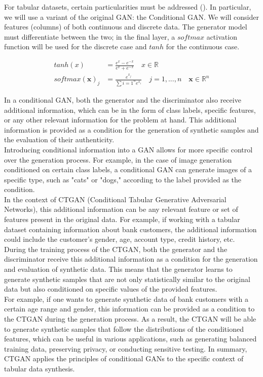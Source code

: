For tabular datasets, certain particularities must be addressed (\cite*{xu2019}). In particular, we will use a variant of the original GAN: the Conditional GAN. We will consider features (columns) of both continuous and discrete data. The generator model must differentiate between the two; in the final layer, a $softmax$ activation function will be used for the discrete case and $tanh$ for the continuous case.

\begin{align*}
tanh(x) &= \frac{e^x - e^{-x}}{e^x + e^{-x}} \quad x \in \mathbb{R} \\
softmax (\mathbf{x})_j &= \frac{e^{x_j}}{\sum{i=1}^n e^{x_i}} \quad j=1,...,n \quad \mathbf{x} \in \mathbb{R}^n
\end{align*}

In a conditional GAN, both the generator and the discriminator also receive additional information, which can be in the form of class labels, specific features, or any other relevant information for the problem at hand. This additional information is provided as a condition for the generation of synthetic samples and the evaluation of their authenticity.\\
Introducing conditional information into a GAN allows for more specific control over the generation process. For example, in the case of image generation conditioned on certain class labels, a conditional GAN can generate images of a specific type, such as "cats" or "dogs," according to the label provided as the condition.\\
In the context of CTGAN (Conditional Tabular Generative Adversarial Networks), this additional information can be any relevant feature or set of features present in the original data. For example, if working with a tabular dataset containing information about bank customers, the additional information could include the customer's gender, age, account type, credit history, etc.\\
During the training process of the CTGAN, both the generator and the discriminator receive this additional information as a condition for the generation and evaluation of synthetic data. This means that the generator learns to generate synthetic samples that are not only statistically similar to the original data but also conditioned on specific values of the provided features.\\
For example, if one wants to generate synthetic data of bank customers with a certain age range and gender, this information can be provided as a condition to the CTGAN during the generation process. As a result, the CTGAN will be able to generate synthetic samples that follow the distributions of the conditioned features, which can be useful in various applications, such as generating balanced training data, preserving privacy, or conducting sensitive testing. In summary, CTGAN applies the principles of conditional GANs to the specific context of tabular data synthesis.\\

